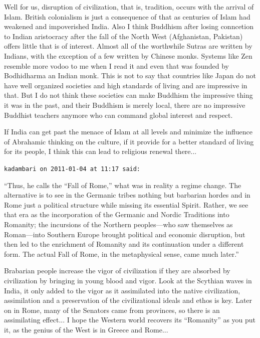 \begin{footnotesize}
\begin{sffamily}
Well for us, disruption of civilization, that is, tradition, occurs with the arrival of Islam. British colonialism is just a consequence of that as centuries of Islam had weakened and impoverished India. Also I think Buddhism after losing conncetion to Indian aristocracy after the fall of the North West (Afghanistan, Pakistan) offers little that is of interest. Almost all of the worthwhile Sutras are written by Indians, with the exception of a few written by Chinese monks. Systems like Zen resemble more vodoo to me when I read it and even that was founded by Bodhidharma an Indian monk. This is not to say that countries like Japan do not have well organized societies and high standards of living and are impressive in that. But I do not think these societies can make Buddhism the impressive thing it was in the past, and their Buddhism is merely local, there are no impressive Buddhist teachers anymore who can command global interest and respect.

If India can get past the menace of Islam at all levels and minimize the influence of Abrahamic thinking on the culture, if it provide for a better standard of living for its people, I think this can lead to religious renewal there... \hfill

\texttt{kadambari on 2011-01-04 at 11:17 said:}

``Thus, he calls the ``Fall of Rome,'' what was in reality a regime change. The alternative is to see in the Germanic tribes nothing but barbarian hordes and in Rome just a political structure while missing its essential Spirit. Rather, we see that era as the incorporation of the Germanic and Nordic Traditions into Romanity; the incursions of the Northern peoples---who saw themselves as Roman---into Southern Europe brought political and economic disruption, but then led to the enrichment of Romanity and its continuation under a different form. The actual Fall of Rome, in the metaphysical sense, came much later.''

Brabarian people increase the vigor of civilization if they are absorbed by civilization by bringing in young blood and vigor. Look at the Scythian waves in India, it only added to the vigor as it assimilated into the native civilization, assimilation and a preservation of the civilizational ideals and ethos is key. Later on in Rome, many of the Senators came from provinces, so there is an assimilating effect... I hope the Western world recovers its ``Romanity'' as you put it, as the genius of the West is in Greece and Rome... 


\end{sffamily}
\end{footnotesize}
